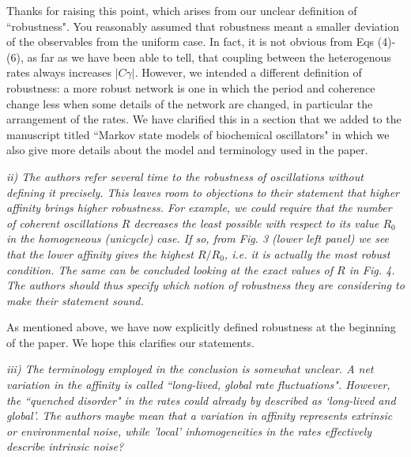 \documentclass[amsmath, preprintnumbers, 12pt, onecolumn, pre, longbibliograpy]{revtex4-1}
\begin{document}
Thanks for raising this point, which arises from our unclear definition of ``robustness". You reasonably assumed that robustness meant a smaller deviation of the observables from the uniform case.  In fact, it is not obvious from Eqs (4)-(6), as far as we have been able to tell, that coupling between the heterogenous rates always increases $|C \gamma|$. However, we intended a different definition of robustness: a more robust network is one in which the period and coherence change less when some details of the network are changed, in particular the arrangement of the rates. We have clarified this in a section that we added to the manuscript titled ``Markov state models of biochemical oscillators" in which we also give more details about the model and terminology used in the paper.


\textit{ii) The authors refer several time to the robustness of oscillations without defining it precisely. This leaves room to objections to their statement that higher affinity brings higher robustness. For example, we could require that the number of coherent oscillations $R$ decreases the least possible with respect to its value $R_0$ in the homogeneous (unicycle) case. If so, from Fig. 3 (lower left panel) we see that the lower affinity gives the highest $R/R_0$, i.e. it is actually the most robust condition. The same can be concluded looking at the exact values of $R$ in Fig. 4.
The authors should thus specify which notion of robustness they are considering to make their statement sound.}

As mentioned above, we have now explicitly defined robustness at the beginning of the paper. We hope this clarifies our statements.


\textit{iii) The terminology employed in the conclusion is somewhat unclear. A net variation in the affinity is called ``long-lived, global rate fluctuations". However, the ``quenched disorder" in the rates could already by described as `long-lived and global'. The authors maybe mean that a variation in affinity represents extrinsic or environmental noise, while 'local' inhomogeneities in the rates effectively describe intrinsic noise?}
\end{document}
